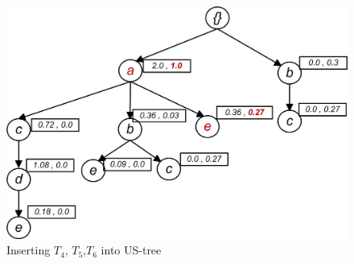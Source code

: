 


\begin{figure}
  \centering
	\includegraphics[width=.4\textwidth]{images/sim_06.jpg}  
	\caption{Inserting $T_4$, $T_5$,$T_6$ into US-tree}
	\label{figure:t6}
\end{figure}

